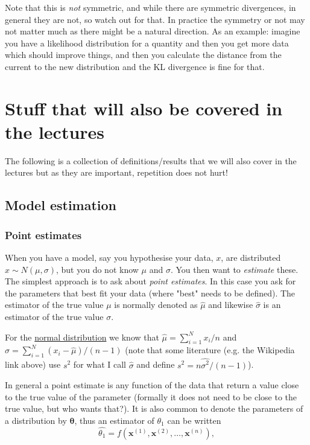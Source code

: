 \documentclass[a4paper,10pt]{article}
\newcommand{\link}[2]{{\color{blue}\href{#1}{#2}}}
\begin{document}
Note that this is \textit{not} symmetric, and while there are symmetric divergences, in general they are not, so watch out for that. In practice the symmetry or not may not matter much as there might be a natural direction. As an example: imagine you have a likelihood distribution for a quantity and then you get more data which should improve things, and then you calculate the distance from the current to the new distribution and the KL divergence is fine for that.


\section{ Stuff that will also be covered in the lectures}

The following is a collection of definitions/results that we will also cover in the lectures but as they are important, repetition does not hurt!

\subsection{ Model estimation}


\subsubsection{ Point estimates}

When you have a model, say you hypothesise your data, $x$, are distributed $x\sim N(\mu, \sigma)$, but you do not know $\mu$ and $\sigma$. You then want to \textit{estimate} these. The simplest approach is to ask about \textit{point estimates}. In this case you ask for the parameters that best fit your data (where "best" needs to be defined). The estimator of the true value $\mu$ is normally denoted as $\hat{\mu}$ and likewise $\hat{\sigma}$ is an estimator of the true value $\sigma$.

For the \link{https://en.wikipedia.org/wiki/Normal_distribution}{normal distribution} we know that $\hat{\mu}=\sum_{i=1}^N x_i/n$ and $\hat{\sigma} = \sum_{i=1}^N \left(x_i-\hat{\mu}\right)/(n-1)$ (note that some literature (e.g. the Wikipedia link above) use $s^2$ for what I call $\hat{\sigma}$ and define $s^2 = n \hat{\sigma^2}/(n-1)$).


In general a point estimate is any function of the data that return a value close to the true value of the parameter (formally it does not need to be close to the true value, but who wants that?). It is also common to denote the parameters of a distribution by $\boldsymbol{\theta}$, thus an estimator of $\theta_1$ can be written
$$\hat{\theta_1} = f(\mathbf{x}^{(1)}, \mathbf{x}^{(2)}, \ldots, \mathbf{x}^{(n)}),$$
\end{document}

